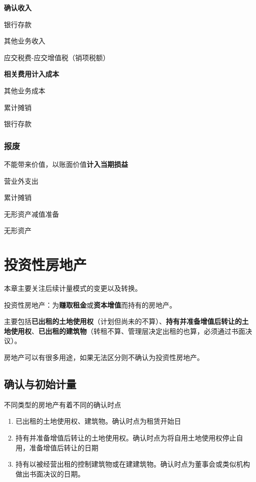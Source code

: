 \documentclass[UTF8,12pt]{ctexart}
\newenvironment{Dr}{%
	\begin{list}{}%
		{
			\setlength{\leftmargin}{2em}
			\setlength{\labelwidth}{2em}
			\setlength{\labelsep}{0pt}
			\setlength{\itemindent}{0pt}
			\setlength{\listparindent}{0pt}
			\setlength{\parsep}{0pt}
			\setlength{\topsep}{0pt}
		}
		\item[\textbf{借：}]
	}{%
	\end{list}
}
\newenvironment{Cr}{%
	\begin{list}{}%
		{
			\setlength{\leftmargin}{2em}
			\setlength{\labelwidth}{2em}
			\setlength{\labelsep}{0pt}
			\setlength{\itemindent}{0pt}
			\setlength{\listparindent}{0pt}
			\setlength{\parsep}{0pt}
			\setlength{\topsep}{0pt}
		}
		\item[\textbf{贷：}]
	}{%
	\end{list}
}
\numberwithin{equation}{section} %
\numberwithin{figure}{section}
\numberwithin{table}{section}
\begin{document}
	\textbf{确认收入}
	
	\begin{Dr}
		银行存款
	\end{Dr}
	\begin{Cr}
		其他业务收入
		
		应交税费-应交增值税（销项税额）
	\end{Cr}

	
	\textbf{相关费用计入成本}
	
	\begin{Dr}
		其他业务成本
	\end{Dr}
	\begin{Cr}
		累计摊销
		
		银行存款
	\end{Cr}
	
	
	\subsubsection{报废}
	
	不能带来价值，以账面价值\textbf{计入当期损益}
	
	\begin{Dr}
		营业外支出
		
		累计摊销
		
		无形资产减值准备
	\end{Dr}
	\begin{Cr}
		无形资产
	\end{Cr}

	
	\newpage
	\section{投资性房地产}
	
	本章主要关注后续计量模式的变更以及转换。
	
	投资性房地产：为\textbf{赚取租金}或\textbf{资本增值}而持有的房地产。
	
	主要包括\textbf{已出租的土地使用权}（计划但尚未的不算）、\textbf{持有并准备增值后转让的土地使用权}、\textbf{已出租的建筑物}（转租不算、管理层决定出租的也算，必须通过书面决议）。
	
	房地产可以有很多用途，如果无法区分则不确认为投资性房地产。
	
	\subsection{确认与初始计量}
	不同类型的房地产有着不同的确认时点
	\begin{enumerate}
		\item 已出租的土地使用权、建筑物。确认时点为租赁开始日
		
		\item 持有并准备增值后转让的土地使用权。确认时点为将自用土地使用权停止自用，准备增值后转让的日期
		
		\item 持有以被经营出租的控制建筑物或在建建筑物。确认时点为董事会或类似机构做出书面决议的日期。
	\end{enumerate}
	
\end{document}
